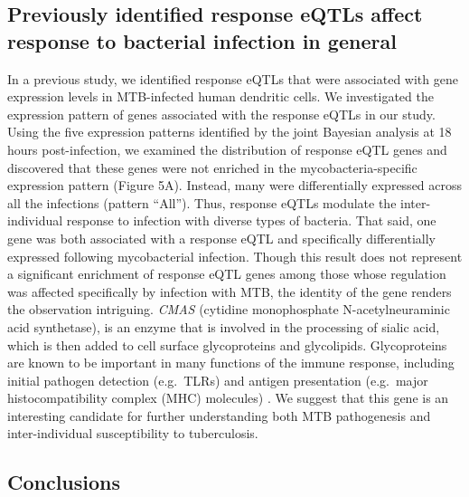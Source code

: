 \subsection{Previously identified response eQTLs affect response to
bacterial infection in
general}\label{previously-identified-response-eqtls-affect-response-to-bacterial-infection-in-general}

In a previous study, we identified response eQTLs that were associated
with gene expression levels in MTB-infected human dendritic cells. We
investigated the expression pattern of genes associated with the
response eQTLs in our study. Using the five expression patterns
identified by the joint Bayesian analysis at 18 hours post-infection, we
examined the distribution of response eQTL genes and discovered that
these genes were not enriched in the mycobacteria-specific expression
pattern (Figure 5A). Instead, many were differentially expressed across
all the infections (pattern ``All''). Thus, response eQTLs modulate the
inter-individual response to infection with diverse types of bacteria.
That said, one gene was both associated with a response eQTL and
specifically differentially expressed following mycobacterial infection.
Though this result does not represent a significant enrichment of
response eQTL genes among those whose regulation was affected
specifically by infection with MTB, the identity of the gene renders the
observation intriguing. \emph{CMAS} (cytidine monophosphate
N-acetylneuraminic acid synthetase), is an enzyme that is involved in
the processing of sialic acid, which is then added to cell surface
glycoproteins and glycolipids. Glycoproteins are known to be important
in many functions of the immune response, including initial pathogen
detection (e.g.~TLRs) and antigen presentation (e.g.~major
histocompatibility complex (MHC) molecules) \citep{Wolfert2013,
Johnson2013, Crespo2013}. We suggest that this gene is an
interesting candidate for further understanding both MTB pathogenesis
and inter-individual susceptibility to tuberculosis.

\subsection{Conclusions}\label{conclusions}

